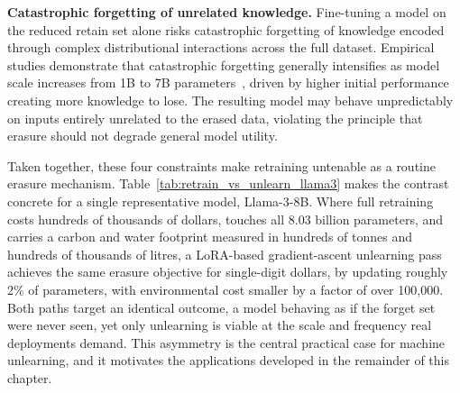 \textbf{Catastrophic forgetting of unrelated knowledge.} Fine-tuning a model on the reduced retain set alone risks catastrophic forgetting of knowledge encoded through complex distributional interactions across the full dataset. Empirical studies demonstrate that catastrophic forgetting generally intensifies as model scale increases from 1B to 7B parameters~\citeauthor{luo2025empirical}, driven by higher initial performance creating more knowledge to lose. The resulting model may behave unpredictably on inputs entirely unrelated to the erased data, violating the principle that erasure should not degrade general model utility.

\begin{table}[htbp]
\centering
\caption{Training cost, carbon footprint, and freshwater use of large foundation models. Values are compiled from model cards, sustainability reports, and subsequent analyses. Water figures depend on data-center cooling infrastructure.}
\label{tab:training_cost}
\end{table}

Taken together, these four constraints make retraining untenable as a routine erasure mechanism. Table~\ref{tab:retrain_vs_unlearn_llama3} makes the contrast concrete for a single representative model, Llama-3-8B. Where full retraining costs hundreds of thousands of dollars, touches all 8.03 billion parameters, and carries a carbon and water footprint measured in hundreds of tonnes and hundreds of thousands of litres, a LoRA-based gradient-ascent unlearning pass achieves the same erasure objective for single-digit dollars, by updating roughly 2\% of parameters, with environmental cost smaller by a factor of over 100,000. Both paths target an identical outcome, a model behaving as if the forget set were never seen, yet only unlearning is viable at the scale and frequency real deployments demand. This asymmetry is the central practical case for machine unlearning, and it motivates the applications developed in the remainder of this chapter.

